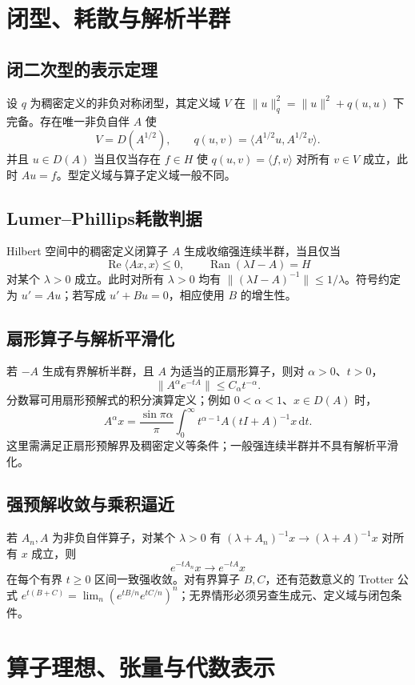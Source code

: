 \documentclass[../main.tex]{subfiles}
\begin{document}
\section{闭型、耗散与解析半群}
\subsection{闭二次型的表示定理}
设 $q$ 为稠密定义的非负对称闭型，其定义域 $V$ 在 $\|u\|_q^2=\|u\|^2+q(u,u)$ 下完备。存在唯一非负自伴 $A$ 使
\[
V=D(A^{1/2}),\qquad q(u,v)=\langle A^{1/2}u,A^{1/2}v\rangle.
\]
并且 $u\in D(A)$ 当且仅当存在 $f\in H$ 使 $q(u,v)=\langle f,v\rangle$ 对所有 $v\in V$ 成立，此时 $Au=f$。型定义域与算子定义域一般不同。
\subsection{Lumer--Phillips耗散判据}
Hilbert 空间中的稠密定义闭算子 $A$ 生成收缩强连续半群，当且仅当
\[
\operatorname{Re}\langle Ax,x\rangle\le0,\qquad
\operatorname{Ran}(\lambda I-A)=H
\]
对某个 $\lambda>0$ 成立。此时对所有 $\lambda>0$ 均有 $\|(\lambda I-A)^{-1}\|\le1/\lambda$。符号约定为 $u'=Au$；若写成 $u'+Bu=0$，相应使用 $B$ 的增生性。
\subsection{扇形算子与解析平滑化}
若 $-A$ 生成有界解析半群，且 $A$ 为适当的正扇形算子，则对 $\alpha>0$、$t>0$，
\[
\|A^\alpha e^{-tA}\|\le C_\alpha t^{-\alpha}.
\]
分数幂可用扇形预解式的积分演算定义；例如 $0<\alpha<1$、$x\in D(A)$ 时，
\[
A^\alpha x=\frac{\sin\pi\alpha}{\pi}\int_0^\infty
t^{\alpha-1}A(tI+A)^{-1}x\,\mathrm dt.
\]
这里需满足正扇形预解界及稠密定义等条件；一般强连续半群并不具有解析平滑化。
\subsection{强预解收敛与乘积逼近}
若 $A_n,A$ 为非负自伴算子，对某个 $\lambda>0$ 有 $(\lambda+A_n)^{-1}x\to(\lambda+A)^{-1}x$ 对所有 $x$ 成立，则
\[
e^{-tA_n}x\to e^{-tA}x
\]
在每个有界 $t\ge0$ 区间一致强收敛。对有界算子 $B,C$，还有范数意义的 Trotter 公式 $e^{t(B+C)}=\lim_n(e^{tB/n}e^{tC/n})^n$；无界情形必须另查生成元、定义域与闭包条件。
\section{算子理想、张量与代数表示}
\end{document}
